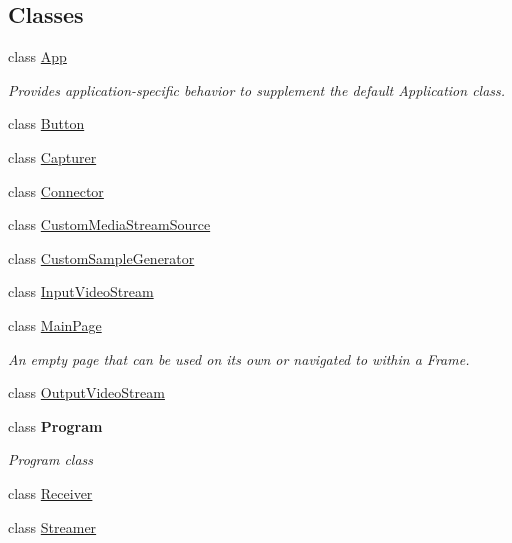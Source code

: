 \subsection*{Classes}
\begin{DoxyCompactItemize}
\item 
class \hyperlink{class_e_l_i_client_1_1_app}{App}
\begin{DoxyCompactList}\small\item\em Provides application-\/specific behavior to supplement the default Application class. \end{DoxyCompactList}\item 
class \hyperlink{class_e_l_i_client_1_1_button}{Button}
\item 
class \hyperlink{class_e_l_i_client_1_1_capturer}{Capturer}
\item 
class \hyperlink{class_e_l_i_client_1_1_connector}{Connector}
\item 
class \hyperlink{class_e_l_i_client_1_1_custom_media_stream_source}{Custom\+Media\+Stream\+Source}
\item 
class \hyperlink{class_e_l_i_client_1_1_custom_sample_generator}{Custom\+Sample\+Generator}
\item 
class \hyperlink{class_e_l_i_client_1_1_input_video_stream}{Input\+Video\+Stream}
\item 
class \hyperlink{class_e_l_i_client_1_1_main_page}{Main\+Page}
\begin{DoxyCompactList}\small\item\em An empty page that can be used on its own or navigated to within a Frame. \end{DoxyCompactList}\item 
class \hyperlink{class_e_l_i_client_1_1_output_video_stream}{Output\+Video\+Stream}
\item 
class {\bfseries Program}
\begin{DoxyCompactList}\small\item\em Program class \end{DoxyCompactList}\item 
class \hyperlink{class_e_l_i_client_1_1_receiver}{Receiver}
\item 
class \hyperlink{class_e_l_i_client_1_1_streamer}{Streamer}
\end{DoxyCompactItemize}
